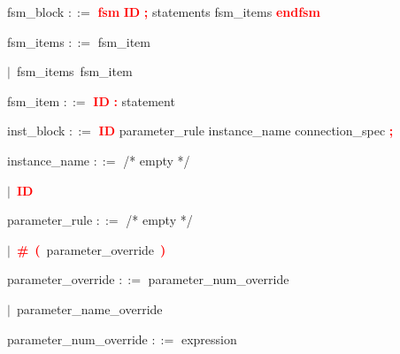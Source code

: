 \vspace{1em}
\noindent
\settowidth{\parindent}{\hspace{4ex}}
fsm\_block $::=$\hspace{1ex} \textbf{\textcolor{red}{fsm}} \textbf{\textcolor{red}{ID}} \textbf{\textcolor{red}{;}} statements fsm\_items \textbf{\textcolor{red}{endfsm}}

\vspace{1em}
\noindent
\settowidth{\parindent}{\hspace{4ex}}
fsm\_items $::=$\hspace{1ex} fsm\_item

\mbox{$|$ fsm\_items fsm\_item}

\vspace{1em}
\noindent
\settowidth{\parindent}{\hspace{4ex}}
fsm\_item $::=$\hspace{1ex} \textbf{\textcolor{red}{ID}} \textbf{\textcolor{red}{:}} statement

\vspace{1em}
\noindent
\settowidth{\parindent}{\hspace{4ex}}
inst\_block $::=$\hspace{1ex} \textbf{\textcolor{red}{ID}} parameter\_rule instance\_name connection\_spec \textbf{\textcolor{red}{;}}

\vspace{1em}
\noindent
\settowidth{\parindent}{\hspace{4ex}}
instance\_name $::=$\hspace{1ex} /* empty */

\mbox{$|$ \textbf{\textcolor{red}{ID}}}

\vspace{1em}
\noindent
\settowidth{\parindent}{\hspace{4ex}}
parameter\_rule $::=$\hspace{1ex} /* empty */

\mbox{$|$ \textbf{\textcolor{red}{\textbf{\textcolor{red}{\#}}}} \textbf{\textcolor{red}{(}} parameter\_override \textbf{\textcolor{red}{)}}}

\vspace{1em}
\noindent
\settowidth{\parindent}{\hspace{4ex}}
parameter\_override $::=$\hspace{1ex} parameter\_num\_override

\mbox{$|$ parameter\_name\_override}

\vspace{1em}
\noindent
\settowidth{\parindent}{\hspace{4ex}}
parameter\_num\_override $::=$\hspace{1ex} expression

